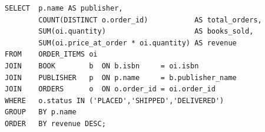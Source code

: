 \begin{lstlisting}[caption={Q11: Revenue per publisher (complex aggregation)}]
SELECT  p.name AS publisher,
        COUNT(DISTINCT o.order_id)           AS total_orders,
        SUM(oi.quantity)                     AS books_sold,
        SUM(oi.price_at_order * oi.quantity) AS revenue
FROM    ORDER_ITEMS oi
JOIN    BOOK        b  ON b.isbn     = oi.isbn
JOIN    PUBLISHER   p  ON p.name     = b.publisher_name
JOIN    ORDERS      o  ON o.order_id = oi.order_id
WHERE   o.status IN ('PLACED','SHIPPED','DELIVERED')
GROUP   BY p.name
ORDER   BY revenue DESC;
\end{lstlisting}